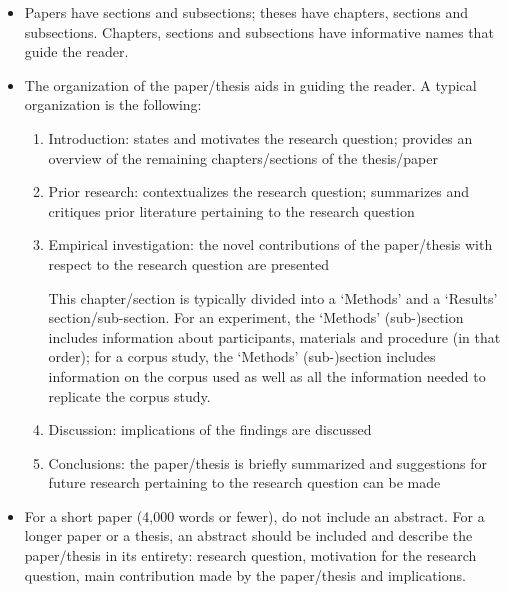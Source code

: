 \documentclass[11pt,fleqn,a4paper/thesis]{article}
\newcommand{\6}{\mbox{$[\hspace*{-.6mm}[$}}
\newcommand{\9}{\mbox{$]\hspace*{-.6mm}]$}}
\begin{document}
\begin{itemize}[itemsep=-1pt,leftmargin=2.5ex,topsep=-2pt]

\item Papers have sections and subsections; theses have chapters, sections and subsections. Chapters, sections and subsections have informative names that guide the reader.

\item The organization of the paper/thesis aids in guiding the reader. A typical organization is the following:

\begin{enumerate}[itemsep=-1pt,leftmargin=3.5ex,topsep=-2pt]

\item Introduction: states and motivates the research question; provides an overview of the remaining chapters/sections of the thesis/paper

\item Prior research: contextualizes the research question; summarizes and critiques prior literature pertaining to the research question

\item Empirical investigation: the novel contributions of the paper/thesis with respect to the research question are presented

This chapter/section is typically divided into a `Methods' and a `Results' section/sub-section. For an experiment, the `Methods' (sub-)section includes information about participants, materials and procedure (in that order); for a corpus study, the `Methods' (sub-)section includes information on the corpus used as well as all the information needed to replicate the corpus study.

\item Discussion: implications of the findings are discussed 

\item Conclusions: the paper/thesis is briefly summarized and suggestions for future research pertaining to the research question can be made

\end{enumerate}



\item For a short paper (4,000 words or fewer), do not include an abstract. For a longer paper or a thesis, an abstract should be included and describe the paper/thesis in its entirety: research question, motivation for the research question, main contribution made by the paper/thesis and implications.



\end{itemize}
\end{document}
